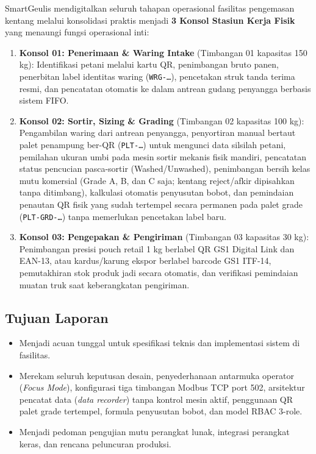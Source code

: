 \documentclass[12pt,a4paper]{article}
\begin{document}
SmartGeulis mendigitalkan seluruh tahapan operasional fasilitas pengemasan kentang melalui konsolidasi praktis menjadi \textbf{3 Konsol Stasiun Kerja Fisik} yang menaungi fungsi operasional inti:
\begin{enumerate}
  \item \textbf{Konsol 01: Penerimaan \& Waring Intake} (Timbangan 01 kapasitas 150 kg):
  Identifikasi petani melalui kartu QR, penimbangan bruto panen, penerbitan label identitas waring (\texttt{WRG-\ldots}), pencetakan struk tanda terima resmi, dan pencatatan otomatis ke dalam antrean gudang penyangga berbasis sistem FIFO.
  
  \item \textbf{Konsol 02: Sortir, Sizing \& Grading} (Timbangan 02 kapasitas 100 kg):
  Pengambilan waring dari antrean penyangga, penyortiran manual bertaut palet penampung ber-QR (\texttt{PLT-\ldots}) untuk mengunci data silsilah petani, pemilahan ukuran umbi pada mesin sortir mekanis fisik mandiri, pencatatan status pencucian pasca-sortir (Washed/Unwashed), penimbangan bersih kelas mutu komersial (Grade A, B, dan C saja; kentang reject/afkir dipisahkan tanpa ditimbang), kalkulasi otomatis penyusutan bobot, dan pemindaian penautan QR fisik yang sudah tertempel secara permanen pada palet grade (\texttt{PLT-GRD-\ldots}) tanpa memerlukan pencetakan label baru.
  
  \item \textbf{Konsol 03: Pengepakan \& Pengiriman} (Timbangan 03 kapasitas 30 kg):
  Penimbangan presisi pouch retail 1 kg berlabel QR GS1 Digital Link dan EAN-13, atau kardus/karung ekspor berlabel barcode GS1 ITF-14, pemutakhiran stok produk jadi secara otomatis, dan verifikasi pemindaian muatan truk saat keberangkatan pengiriman.
\end{enumerate}

\subsection{Tujuan Laporan}
\begin{itemize}
  \item Menjadi acuan tunggal untuk spesifikasi teknis dan implementasi sistem di fasilitas.
  \item Merekam seluruh keputusan desain, penyederhanaan antarmuka operator (\emph{Focus Mode}), konfigurasi tiga timbangan Modbus TCP port 502, arsitektur pencatat data (\emph{data recorder}) tanpa kontrol mesin aktif, penggunaan QR palet grade tertempel, formula penyusutan bobot, dan model RBAC 3-role.
  \item Menjadi pedoman pengujian mutu perangkat lunak, integrasi perangkat keras, dan rencana peluncuran produksi.
\end{itemize}
\end{document}
